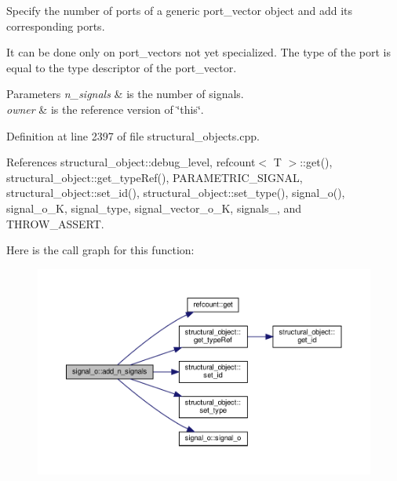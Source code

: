 Specify the number of ports of a generic port\+\_\+vector object and add its corresponding ports. 

It can be done only on port\+\_\+vectors not yet specialized. The type of the port is equal to the type descriptor of the port\+\_\+vector. 
\begin{DoxyParams}{Parameters}
{\em n\+\_\+signals} & is the number of signals. \\
\hline
{\em owner} & is the reference version of \char`\"{}this\char`\"{}. \\
\hline
\end{DoxyParams}


Definition at line 2397 of file structural\+\_\+objects.\+cpp.



References structural\+\_\+object\+::debug\+\_\+level, refcount$<$ T $>$\+::get(), structural\+\_\+object\+::get\+\_\+type\+Ref(), P\+A\+R\+A\+M\+E\+T\+R\+I\+C\+\_\+\+S\+I\+G\+N\+AL, structural\+\_\+object\+::set\+\_\+id(), structural\+\_\+object\+::set\+\_\+type(), signal\+\_\+o(), signal\+\_\+o\+\_\+K, signal\+\_\+type, signal\+\_\+vector\+\_\+o\+\_\+K, signals\+\_\+, and T\+H\+R\+O\+W\+\_\+\+A\+S\+S\+E\+RT.

Here is the call graph for this function\+:
\nopagebreak
\begin{figure}[H]
\begin{center}
\leavevmode
\includegraphics[width=350pt]{db/d5c/classsignal__o_ad5d3e5aa20af5d00401badcf9dcabbeb_cgraph}
\end{center}
\end{figure}
\mbox{\label{classsignal__o_aea73b187bccd2428fb0698638e657bdd}} 
